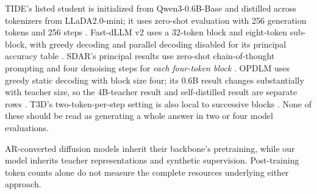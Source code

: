 TIDE's listed student is initialized from Qwen3-0.6B-Base and distilled across tokenizers from LLaDA2.0-mini; it uses zero-shot evaluation with 256 generation tokens and 256 steps \citep{tide}. Fast-dLLM v2 uses a 32-token block and eight-token sub-block, with greedy decoding and parallel decoding disabled for its principal accuracy table \citep{fastv2}. SDAR's principal results use zero-shot chain-of-thought prompting and four denoising steps for \emph{each four-token block} \citep{sdar}. OPDLM uses greedy static decoding with block size four; its 0.6B result changes substantially with teacher size, so the 4B-teacher result and self-distilled result are separate rows \citep{opdlm}. T3D's two-token-per-step setting is also local to successive blocks \citep{t3d}. None of these should be read as generating a whole answer in two or four model evaluations.

AR-converted diffusion models inherit their backbone's pretraining, while our model inherits teacher representations and synthetic supervision. Post-training token counts alone do not measure the complete resources underlying either approach.


